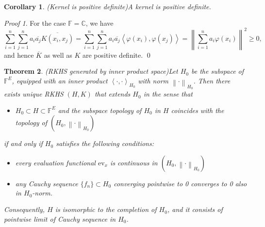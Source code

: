 \documentclass[a4paper,12pt]{article}
\newtheorem{thm}{Theorem}[section]
\newtheorem{cor}[thm]{Corollary}
\theoremstyle{remark}
\newtheorem*{prf}{Proof}
\theoremstyle{definition}
\theoremstyle{definition}
\theoremstyle{definition}
\newcommand{\ip}[2]{\left<#1, #2 \right>}
\newcommand{\norm}[1]{\left\| #1 \right\|}
\newcommand{\ev}[1]{\mathrm{ev}_{#1}}
\begin{document}
\begin{cor} (Kernel is positive definite)\label{kernel is pd}
	A kernel is positive definite.
\end{cor}
\begin{prf}
	For the case \( \mathbb{F}=\mathbb{C} \), we have
	\begin{equation*}
		\sum_{i=1}^{n} \sum_{j=1}^{n} a_i \overline{a_j} \overline{K(x_i,x_j)}
		= \sum_{i=1}^{n} \sum_{j=1}^{n} a_i \overline{a_j} \ip{\varphi(x_i)}{\varphi(x_j)}
		= \norm{\sum_{i=1}^{n} a_i \varphi(x_i) }^2 \ge 0,
	\end{equation*}
	and hence \( \overline{K} \) as well as \( K \) are positive definite.
	\qed\end{prf}

\begin{thm} (RKHS generated by inner product space)\label{RKHS generated by ip sp}
	Let \( H_0 \) be the subspace of \( \mathbb{F}^E \), equipped with an inner product \( \ip{\cdot }{\cdot }_{H_0} \) with norm \( \norm{\cdot }_{H_0} \).
	Then there exists unique RKHS \( (H,K) \) that extends \( H_0 \) in the sense that
	\begin{itemize}
		\item[(a)] \( H_0 \subset H \subset \mathbb{F}^E\) and the subspace topology of \( H_0 \) in \( H \) coincides with the topology of \( (H_0, \norm{\cdot }_{H_0}) \)
	\end{itemize}
	if and only if \( H_0 \) satisfies the following conditions:
	\begin{itemize}
		\item[(b)] every evaluation functional \( \ev{x} \) is continuous in \( (H_0, \norm{\cdot }_{H_0})\)
		\item[(c)] any Cauchy sequence \( \{f_n\} \subset H_0 \) converging pointwise to 0 converges to 0 also in \( H_0 \)-norm.
	\end{itemize}
	Consequently, \( H \) is isomorphic to the completion of \( H_0 \), and it consists of pointwise limit of Cauchy sequence in \( H_0 \).
\end{thm}
\end{document}
